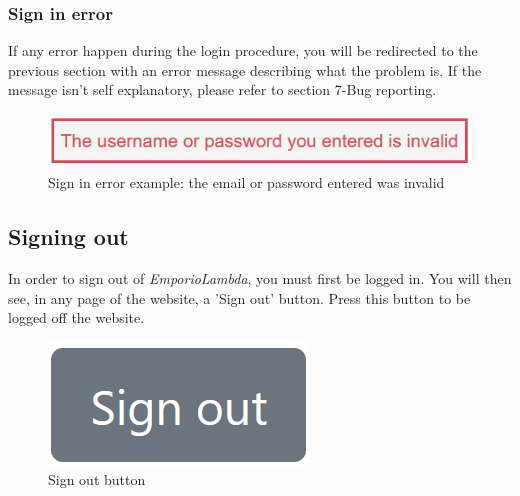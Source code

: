 \subsubsection{Sign in error}
If any error happen during the login procedure, you will be redirected to the previous section with an error message describing what the problem is. If the message isn't self explanatory, please refer to section 7-Bug reporting.

\begin{figure}[H]
\centering
\includegraphics[scale=0.6]{res/Immagini/SigninError}
\caption{Sign in error example: the email or password entered was invalid}
\end{figure}

\subsection{Signing out}
In order to sign out of \textit{EmporioLambda}, you must first be logged in. You will then see, in any page of the website, a 'Sign out' button. Press this button to be logged off the website.

\begin{figure}[H]
\centering
\includegraphics[scale=0.6]{res/Immagini/SignoutButton}
\caption{Sign out button}
\end{figure}
